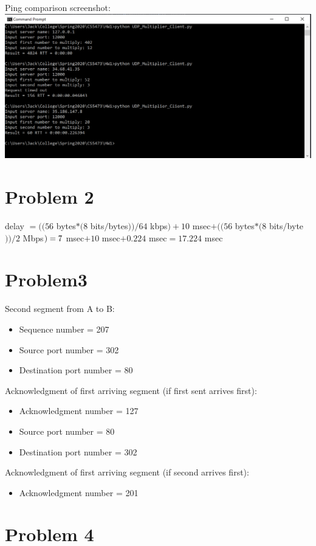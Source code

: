 \documentclass[12pt]{article}
\begin{document}
Ping comparison screenshot:\\
\includegraphics[width=\textwidth]{ping_comparison}


\section*{Problem 2}

delay $= ((56 $ bytes$ * (8 $ bits$/$bytes$)) / 64 $ kbps$) + 10 $ msec$ + ((56 $ bytes$ * (8 $ bits$/$byte$)) / 2 $ Mbps$) \\= 7 $ msec$ + 10 $ msec$ + 0.224 $ msec$	= 17.224$ msec


\section*{Problem3}

Second segment from A to B:

\begin{itemize}
	\item Sequence number = 207
	\item Source port number = 302
	\item Destination port number = 80
\end{itemize}
Acknowledgment of first arriving segment (if first sent arrives first):
\begin{itemize}
	\item Acknowledgment number = 127
	\item Source port number = 80
	\item Destination port number = 302
\end{itemize}
Acknowledgment of first arriving segment (if second arrives first):
\begin{itemize}
	\item Acknowledgment number = 201
\end{itemize}


\section*{Problem 4}
\end{document}

